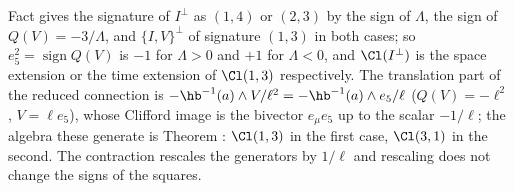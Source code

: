 Fact  gives the signature of $I^{\perp}$ as $(1,4)$ or $(2,3)$ by the sign of $\Lambda$, the sign of $Q(V) = -3/\Lambda$, and $\{I,V\}^{\perp}$ of signature $(1,3)$ in both cases; so $e_{5}^{2} = \operatorname{sign}Q(V)$ is $-1$ for $\Lambda > 0$ and $+1$ for $\Lambda < 0$, and $\Cl(I^{\perp})$ is the space extension or the time extension of $\Cl(1,3)$ respectively. The translation part of the reduced connection is $-\hb^{-1}(a)\wedge V/\ell^{2} = -\hb^{-1}(a)\wedge e_{5}/\ell$ ($Q(V) = -\ell^{2}$, $V = \ell e_{5}$), whose Clifford image is the bivector $e_{\mu}e_{5}$ up to the scalar $-1/\ell$; the algebra these generate is Theorem : $\Cl(1,3)$ in the first case, $\Cl(3,1)$ in the second. The contraction rescales the generators by $1/\ell$ and rescaling does not change the signs of the squares.
